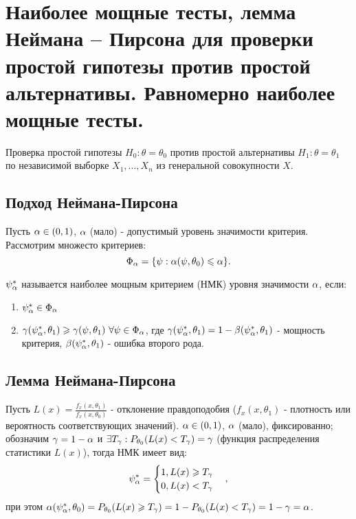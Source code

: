\section{Наиболее мощные тесты, лемма Неймана – Пирсона для проверки простой гипотезы против простой
альтернативы. Равномерно наиболее мощные тесты.}

Проверка простой гипотезы $H_0 : \theta = \theta_0$ против простой альтернативы $H_1 : \theta = \theta_1$ по независимой выборке $X_1, ..., X_n$ из генеральной совокупности $X$.

\subsection{Подход Неймана-Пирсона}
Пусть $\alpha \in (0, 1)$, $\alpha$ (мало) - допустимый уровень значимости критерия. Рассмотрим множесто критериев:
\[
  \Phi_{\alpha} = \{ \psi : \alpha(\psi, \theta_0) \leqslant \alpha \}\\
.\]

\begin{definition}
  $\psi_{\alpha}^{*}$ называется наиболее мощным критерием (НМК) уровня значимости $\alpha$, если:
  \begin{enumerate}
    \item $\psi_{\alpha}^{*} \in \Phi_{\alpha}$
    \item $\gamma(\psi_{\alpha}^{*}, \theta_1) \geqslant \gamma(\psi, \theta_1)~\forall \psi \in \Phi_{\alpha}$,
      где $\gamma(\psi_{\alpha}^{*}, \theta_1) = 1 - \beta(\psi_{\alpha}^{*}, \theta_1)$ - мощность критерия, $\beta(\psi_{\alpha}^{*}, \theta_1)$ - ошибка второго рода.
  \end{enumerate}
\end{definition}

\subsection{Лемма Неймана-Пирсона}

Пусть $L(x) = \frac{f_x(x, \theta_1)}{f_x(x, \theta_0)}$ - отклонение правдоподобия ($f_x(x, \theta_1)$ - плотность или вероятность соответствующих значений).
$\alpha \in (0, 1)$, $\alpha$ (мало), фиксированно; обозначим $\gamma = 1 - \alpha$ и $\exists T_{\gamma}: P_{\theta_0}(L(x) < T_{\gamma}) = \gamma$ (функция распределения статистики $L(x)$), тогда НМК имеет вид:
\[
  \psi_{\alpha}^{*} =
  \begin{cases}
    1, L(x) \geqslant T_{\gamma} \\
    0, L(x) < T_{\gamma}
  \end{cases}
,\] 
при этом $\alpha(\psi_{\alpha}^{*}, \theta_0) = P_{\theta_0}(L(x) \geqslant T_{\gamma}) = 1 - P_{\theta_0}(L(x) < T_{\gamma}) = 1 - \gamma = \alpha$.

